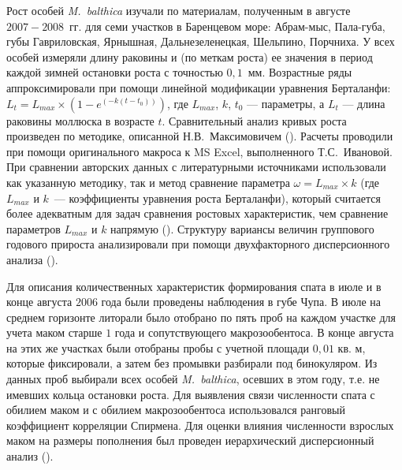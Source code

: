 Рост особей \textit{M.~balthica} изучали по материалам, полученным в августе $2007 - 2008$~гг. для семи участков в Баренцевом море: Абрам-мыс, Пала-губа, губы Гавриловская, Ярнышная, Дальнезеленецкая, Шельпино, Порчниха.
У всех особей измеряли длину раковины и (по меткам роста) ее значения в период каждой зимней остановки роста с точностью $0,1$~мм.
Возрастные ряды аппроксимировали при помощи линейной модификации уравнения Берталанфи: $L_{t} = L_{max} \times (1 - e^{(-k(t - t_{0}))})$, где $L_{max}$, $k$, $t_{0}$ --- параметры, а $L_{t}$ --- длина раковины моллюска в возрасте $t$.
Сравнительный анализ кривых роста произведен по методике, описанной Н.В.~Максимовичем (\cite*{Maximovich_1989}). 
Расчеты проводили при помощи оригинального макроса к MS Excel, выполненного Т.С.~Ивановой.
При сравнении авторских данных с литературными источниками использовали как указанную методику, так и метод сравнение параметра $\omega = L_{max} \times k$ (где $L_{max}$ и $k$~--- коэффициенты уравнения роста Берталанфи), который считается более адекватным для задач сравнения ростовых характеристик, чем сравнение параметров $L_{max}$ и $k$ напрямую (\cite{Appeldoorn_1983, Beukema_Meehan_1985}). 
Структуру вариансы величин группового годового прироста анализировали при помощи двухфакторного дисперсионного анализа (\cite{Chambers_Hastie_1991}). 

Для описания количественных характеристик формирования спата в июле и в конце августа $2006$ года были проведены наблюдения в губе Чупа.
В июле на среднем горизонте литорали было отобрано по пять проб на каждом участке для учета маком старше $1$ года и сопутствующего макрозообентоса. 
В конце августа на этих же участках были отобраны пробы с учетной площади $0,01$ кв. м, которые фиксировали, а затем без промывки разбирали под бинокуляром.  
Из данных проб выбирали всех особей \textit{M.~balthica}, осевших в этом году, т.е. не имевших кольца остановки роста. 
Для выявления связи численности спата с обилием маком и с обилием макрозообентоса использовался ранговый коэффициент корреляции Спирмена.
Для оценки влияния численности взрослых маком на размеры пополнения был проведен иерархический дисперсионный анализ  (\cite{Chambers_Hastie_1991}).

